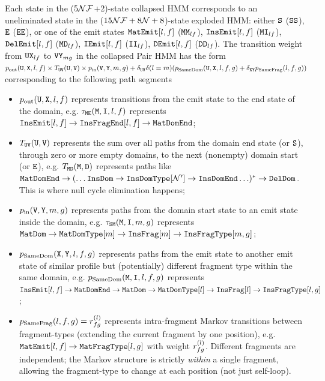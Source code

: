 Each state in the ($5\mathcal{N}\mathcal{F}$+2)-state collapsed HMM corresponds to an uneliminated state in the ($15\mathcal{N}\mathcal{F}+8\mathcal{N}+8$)-state exploded HMM: either ${\tt S}$ (${\tt S}{\tt S}$), ${\tt E}$ (${\tt E}{\tt E}$), or one of the emit states
$\mathtt{MatEmit}[l,f]$ (${\tt M}{\tt M}_{lf}$), $\mathtt{InsEmit}[l,f]$ (${\tt M}{\tt I}_{lf}$), $\mathtt{DelEmit}[l,f]$ (${\tt M}{\tt D}_{lf}$),
  $\mathtt{IEmit}[l,f]$ (${\tt I}{\tt I}_{lf}$), $\mathtt{DEmit}[l,f]$ (${\tt D}{\tt D}_{lf}$).
The transition weight from ${\tt U}{\tt X}_{lf}$ to ${\tt V}{\tt Y}_{mg}$ in the collapsed Pair HMM
has the form $p_\mathrm{out}({\tt U},{\tt X},l,f) \times T_{{\tt U}{\tt V}}({\tt U},{\tt V}) \times p_\mathrm{in}({\tt V},{\tt Y},m,g) + \delta_{{\tt U}{\tt V}} \delta(l=m) (p_\text{SameDom}({\tt U},{\tt X},l,f,g) + \delta_{{\tt X}{\tt Y}} p_\text{SameFrag}(l,f,g))$
corresponding to the following path segments
\begin{itemize}
  \item $p_\mathrm{out}({\tt U},{\tt X},l,f)$ represents transitions from the emit state to the end state of the domain, e.g. $\tau_{{\tt M}{\tt E}}({\tt M},{\tt I},l,f)$ represents $\mathtt{InsEmit}[l,f] \to \mathtt{InsFragEnd}[l,f] \to \mathtt{MatDomEnd}$;
  \item $T_{{\tt U}{\tt V}}({\tt U},{\tt V})$ represents the sum over all paths from the domain end state (or ${\tt S}$), through zero or more empty domains, to the next (nonempty) domain start (or ${\tt E}$), e.g. $T_{{\tt M}{\tt D}}({\tt M},{\tt D})$ represents paths like $\mathtt{MatDomEnd} \to (\ldots \mathtt{InsDom} \to \mathtt{InsDomType}[\mathcal{N}'] \to \mathtt{InsDomEnd} \ldots )^\ast \to \mathtt{DelDom}$. This is where null cycle elimination happens;
  \item $p_\mathrm{in}({\tt V},{\tt Y},m,g)$ represents paths from the domain start state to an emit state inside the domain, e.g. $\tau_{{\tt S}{\tt M}}({\tt M},{\tt I},m,g)$ represents $\mathtt{MatDom} \to \mathtt{MatDomType}[m] \to \mathtt{InsFrag}[m] \to \mathtt{InsFragType}[m,g]$;
  \item $p_\text{SameDom}({\tt X},{\tt Y},l,f,g)$ represents paths from the emit state to another emit state of similar profile but (potentially) different fragment type within the same domain, e.g. $p_\text{SameDom}({\tt M},{\tt I},l,f,g)$ represents $\mathtt{InsEmit}[l,f] \to \mathtt{MatDomEnd} \to \mathtt{MatDom} \to \mathtt{MatDomType}[l] \to \mathtt{InsFrag}[l] \to \mathtt{InsFragType}[l,g]$;
  \item $p_\text{SameFrag}(l,f,g) = r^{(l)}_{fg}$ represents intra-fragment Markov transitions between fragment-types (extending the current fragment by one position), e.g.\ $\mathtt{MatEmit}[l,f] \to \mathtt{MatFragType}[l,g]$ with weight $r^{(l)}_{fg}$. Different fragments are independent; the Markov structure is strictly \emph{within} a single fragment, allowing the fragment-type to change at each position (not just self-loop).
\end{itemize}

